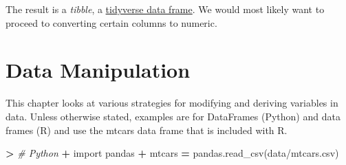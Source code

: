 \documentclass[
]{book}
\newenvironment{Shaded}{\begin{snugshade}}{\end{snugshade}}
\newcommand{\CommentTok}[1]{\textcolor[rgb]{0.56,0.35,0.01}{\textit{#1}}}
\newcommand{\DecValTok}[1]{\textcolor[rgb]{0.00,0.00,0.81}{#1}}
\newcommand{\ErrorTok}[1]{\textcolor[rgb]{0.64,0.00,0.00}{\textbf{#1}}}
\newcommand{\FunctionTok}[1]{\textcolor[rgb]{0.00,0.00,0.00}{#1}}
\newcommand{\ImportTok}[1]{#1}
\newcommand{\NormalTok}[1]{#1}
\newcommand{\OperatorTok}[1]{\textcolor[rgb]{0.81,0.36,0.00}{\textbf{#1}}}
\newcommand{\OtherTok}[1]{\textcolor[rgb]{0.56,0.35,0.01}{#1}}
\newcommand{\SpecialCharTok}[1]{\textcolor[rgb]{0.00,0.00,0.00}{#1}}
\newcommand{\StringTok}[1]{\textcolor[rgb]{0.31,0.60,0.02}{#1}}
\begin{document}
\begin{Shaded}
\end{Shaded}

The result is a \emph{tibble}, a \href{https://tibble.tidyverse.org/}{tidyverse data frame}. We would most likely want to proceed to converting certain columns to numeric.

\hypertarget{data-manipulation}{%
\chapter{Data Manipulation}\label{data-manipulation}}

This chapter looks at various strategies for modifying and deriving variables in data. Unless otherwise stated, examples are for DataFrames (Python) and data frames (R) and use the mtcars data frame that is included with R.

\begin{Shaded}
\begin{Highlighting}[]
\OperatorTok{\textgreater{}} \CommentTok{\# Python}
\OperatorTok{+} \ImportTok{import}\NormalTok{ pandas}
\OperatorTok{+}\NormalTok{ mtcars }\OperatorTok{=}\NormalTok{ pandas.read\_csv(}\StringTok{\textquotesingle{}data/mtcars.csv\textquotesingle{}}\NormalTok{)}
\end{Highlighting}
\end{Shaded}
\end{document}
